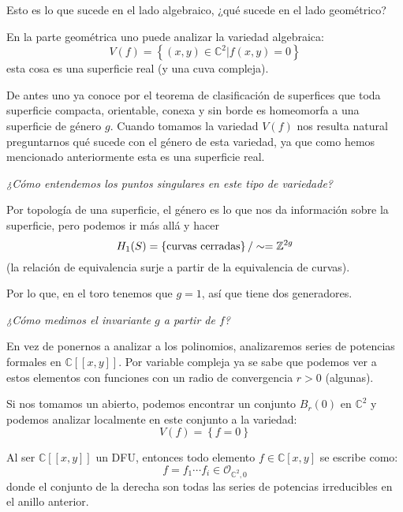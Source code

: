 \documentclass[12pt]{report}
\newcounter{it}
\theoremstyle{largebreak}
\begin{document}
    Esto es lo que sucede en el lado algebraico, ¿qué sucede en el lado geométrico?

    En la parte geométrica uno puede analizar la variedad algebraica:
    \begin{equation*}
        V(f)=\left\{(x,y)\in\mathbb{C}^2\Big|f(x,y)=0 \right\}
    \end{equation*}
    esta cosa es una superficie real (y una cuva compleja).

    De antes uno ya conoce por el teorema de clasificación de superfices que toda superficie compacta, orientable, conexa y sin borde es homeomorfa a una superficie de género $g$. Cuando tomamos la variedad $V(f)$ nos resulta natural preguntarnos qué sucede con el género de esta variedad, ya que como hemos mencionado anteriormente esta es una superficie real.

    \begin{center}
        \textit{¿Cómo entendemos los puntos singulares en este tipo de variedade?}
    \end{center}

    Por topología de una superficie, el género es lo que nos da información sobre la superficie, pero podemos ir más allá y hacer
    \begin{equation*}
        H_1(S)=\left\{\textup{curvas cerradas} \right\}/\sim=\mathbb{Z}^{2g}
    \end{equation*}
    (la relación de equivalencia surje a partir de la equivalencia de curvas).

    Por lo que, en el toro tenemos que $g=1$, así que tiene dos generadores.

    \begin{center}
        \textit{¿Cómo medimos el invariante $g$ a partir de $f$?}
    \end{center}

    En vez de ponernos a analizar a los polinomios, analizaremos series de potencias formales en $\mathbb{C}[[x,y]]$. Por variable compleja ya se sabe que podemos ver a estos elementos con funciones con un radio de convergencia $r>0$ (algunas).

    Si nos tomamos un abierto, podemos encontrar un conjunto $B_r(0)$ en $\mathbb{C}^2$ y podemos analizar localmente en este conjunto a la variedad:
    \begin{equation*}
        V(f)=\left\{f=0 \right\}
    \end{equation*}

    Al ser $\mathbb{C}[[x,y]]$ un DFU, entonces todo elemento $f\in\mathbb{C}[x,y]$ se escribe como:
    \begin{equation*}
        f=f_1\cdots f_i\in\mathcal{O}_{\mathbb{C}^2,0}
    \end{equation*}
    donde el conjunto de la derecha son todas las series de potencias irreducibles en el anillo anterior.
\end{document}
